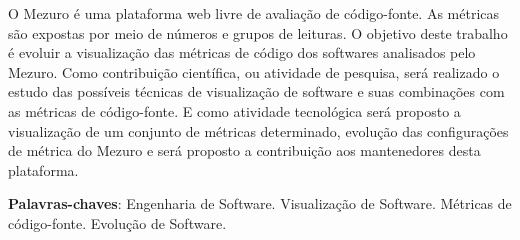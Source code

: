 \begin{resumo}
 O Mezuro é uma plataforma web livre de avaliação de código-fonte.
 As métricas são expostas por meio de números e grupos de leituras.
 O objetivo deste trabalho é evoluir a visualização das métricas de
 código dos softwares analisados pelo Mezuro. Como contribuição científica,
 ou atividade de pesquisa, será realizado o estudo das possíveis técnicas
 de visualização de software e suas combinações com as métricas de
 código-fonte. E como atividade tecnológica será proposto a visualização
 de um conjunto de métricas determinado, evolução das configurações de
 métrica do Mezuro e será proposto a contribuição aos mantenedores desta
 plataforma.

 \vspace{\onelineskip}

 \noindent
 \textbf{Palavras-chaves}: Engenharia de Software. Visualização de Software.
 Métricas de código-fonte. Evolução de Software.
\end{resumo}
